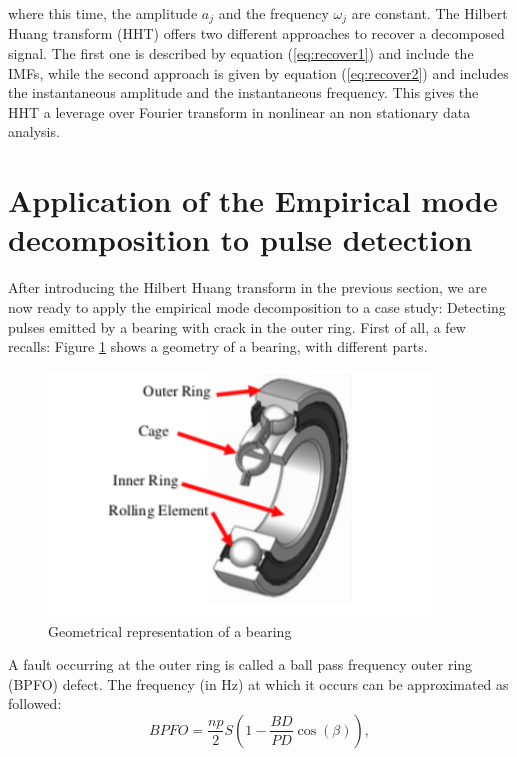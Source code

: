 \documentclass[../Main/thesis.tex]{subfiles}
\begin{document}
where this time, the amplitude $a_{j}$ and the frequency $\omega_{j}$ are constant. The Hilbert Huang transform (HHT) offers two different approaches to recover a decomposed signal. The first one is described by equation (\ref{eq:recover1}) and include the IMFs, while the second approach is given by equation (\ref{eq:recover2}) and includes the instantaneous amplitude and the instantaneous frequency. This gives the HHT a leverage over Fourier transform in nonlinear an non stationary data analysis.

\section{Application of the Empirical mode decomposition to pulse detection}
\label{sec:pulse}
After introducing the Hilbert Huang transform in the previous section, we are now ready to apply the empirical mode decomposition to a case study: Detecting pulses emitted by a bearing with crack in the outer ring. First of all, a few recalls: Figure \ref{fig:bearing-architecture} shows a geometry of a bearing, with different parts.
\begin{figure}[H] %
   \centering
   \includegraphics[width=4in]{../fig/bearing.png} 
   \caption{Geometrical representation of a bearing}
   \label{fig:bearing-architecture}
\end{figure}
\justify
A fault occurring at the outer ring is called a ball pass frequency outer ring (BPFO) defect. The frequency (in Hz) at which it occurs can be approximated as followed:
\begin{equation}
BPFO = \frac{np}{2}S\left(1-\frac{BD}{PD}\cos\left(\beta\right)  \right) \nonumber,
\end{equation}
\end{document}
